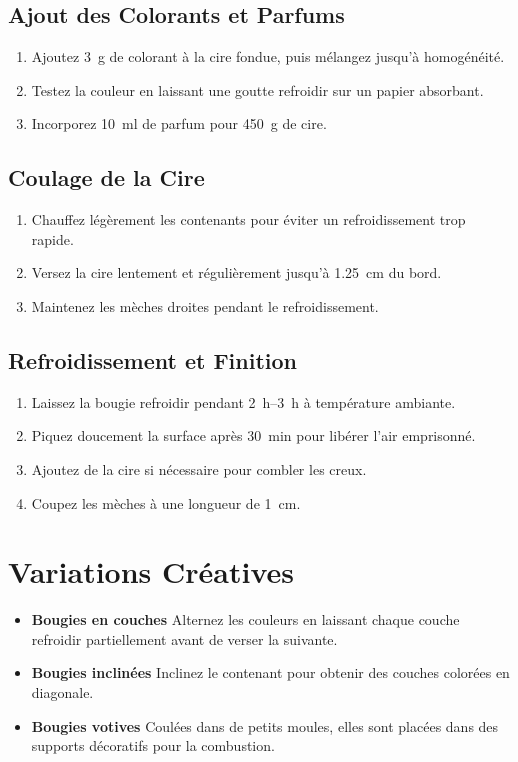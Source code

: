 \documentclass[11pt,fleqn,onecolumn,oneside]{book}
\begin{document}
\subsection*{Ajout des Colorants et Parfums}
\begin{enumerate}
    \item Ajoutez \SI{3}{\gram} de colorant à la cire fondue, puis mélangez jusqu’à homogénéité.
    \item Testez la couleur en laissant une goutte refroidir sur un papier absorbant.
    \item Incorporez \SI{10}{\milli\litre} de parfum pour \SI{450}{\gram} de cire.
\end{enumerate}

\subsection*{Coulage de la Cire}
\begin{enumerate}
    \item Chauffez légèrement les contenants pour éviter un refroidissement trop rapide.
    \item Versez la cire lentement et régulièrement jusqu’à \SI{1.25}{\centi\metre} du bord.
    \item Maintenez les mèches droites pendant le refroidissement.
\end{enumerate}

\subsection*{Refroidissement et Finition}
\begin{enumerate}
    \item Laissez la bougie refroidir pendant \SIrange{2}{3}{\hour} à température ambiante.
    \item Piquez doucement la surface après \SI{30}{\minute} pour libérer l’air emprisonné.
    \item Ajoutez de la cire si nécessaire pour combler les creux.
    \item Coupez les mèches à une longueur de \SI{1}{\centi\metre}.
\end{enumerate}

\section{Variations Créatives}
\begin{itemize}
    \item \textbf{Bougies en couches} Alternez les couleurs en laissant chaque couche refroidir partiellement avant de verser la suivante.
    \item \textbf{Bougies inclinées} Inclinez le contenant pour obtenir des couches colorées en diagonale.
    \item \textbf{Bougies votives} Coulées dans de petits moules, elles sont placées dans des supports décoratifs pour la combustion.
\end{itemize}
\end{document}
